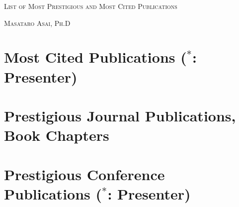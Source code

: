 


\pagestyle{empty}

\begin{center}
{\huge\textsc{List of Most Prestigious and Most Cited Publications}}
\vspace{0.7\baselineskip}

{\Large\textsc{Masataro Asai, Ph.D}}
\vspace{0.5\baselineskip}

\small

\end{center}

\section{Most Cited Publications ($^*$: Presenter)}

\nocite{Asai2018}
\putbib

\section{Prestigious Journal Publications, Book Chapters}

\nocite{Asai2022}
\nocite{Asai2017}
\putbib

\section{Prestigious Conference Publications ($^*$: Presenter)}

\nocite{Asai2022b}
\nocite{Asai2022c}
\nocite{Asai2020}
\nocite{Asai2019a}
\nocite{Asai2019b}
\nocite{Asai2018}
\nocite{Asai2017e}
\nocite{Asai2017b}
\nocite{Asai2016b}
\nocite{Asai2016}
\nocite{Asai2015}
\nocite{Asai2014}
\putbib




